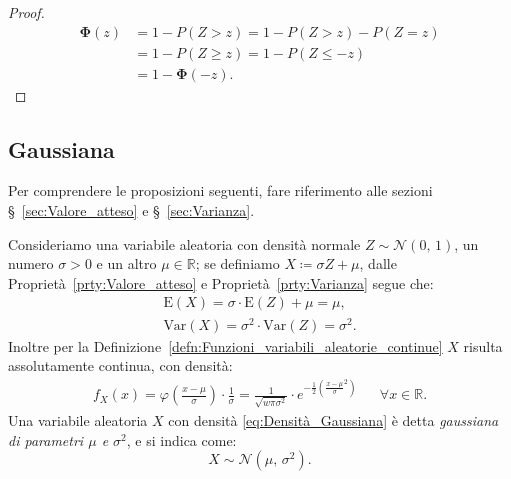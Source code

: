             \begin{proof}
                \hfill
                \begin{align*}
                    \mathbf{\Phi}(z) &= 1 - P(Z > z) = 1 - P(Z > z) - P(Z = z) \\
                                     &= 1 - P(Z \geq z) = 1 - P(Z \leq -z) \\
                                     &= 1 - \mathbf{\Phi}(-z)
                .\end{align*}
            \end{proof}
        \subsection{Gaussiana}
            \begin{note}
                Per comprendere le proposizioni seguenti, fare riferimento alle sezioni §~\ref{sec:Valore_atteso} e §~\ref{sec:Varianza}.
            \end{note}
            \begin{defn}\label{defn:Gaussiana}
                Consideriamo una variabile aleatoria con densità normale $Z \sim \mathcal{N}(0,\,1)$, un numero $\sigma > 0$ e un altro $\mu \in \mathbb{R}$; se definiamo $X \coloneqq \sigma Z + \mu$, dalle Proprietà~\ref{prty:Valore_atteso} e Proprietà~\ref{prty:Varianza} segue che:
                \begin{gather*}
                    \text{E}(X) = \sigma \cdot \text{E}(Z) + \mu = \mu, \\
                    \text{Var}(X) = \sigma^2 \cdot \text{Var}(Z) = \sigma^2
                .\end{gather*}
                Inoltre per la Definizione~\ref{defn:Funzioni_variabili_aleatorie_continue} $X$ risulta assolutamente continua, con densità:
                \begin{align}\label{eq:Densità_Gaussiana}
                    f_X(x) = \varphi \left(\frac{x-\mu}{\sigma}\right)\cdot \frac{1}{\sigma} = \frac{1}{\sqrt{w\pi\sigma^2}} \cdot e^{-\frac{1}{2}\left(\frac{x-\mu}{\sigma}^2\right)} & & \forall x \in \mathbb{R}
                .\end{align}
                Una variabile aleatoria $X$ con densità \eqref{eq:Densità_Gaussiana} è detta \emph{gaussiana di parametri $\mu$ e $\sigma^2$}, e si indica come: \[
                    X \sim \mathcal{N}(\mu,\,\sigma^2)
                .\] 
            \end{defn}
